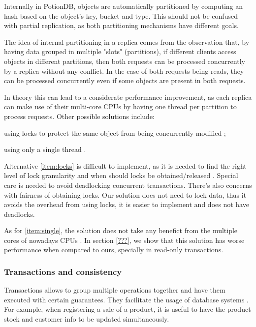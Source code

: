 \documentclass{vldb}
\begin{document}
Internally in PotionDB, objects are automatically partitioned by computing an hash based on the object's key, bucket and type.
This should not be confused with partial replication, as both partitioning mechanisms have different goals.

The idea of internal partitioning in a replica comes from the observation that, by having data grouped in multiple "slots" (partitions), if different clients access objects in different partitions, then both requests can be processed concurrently by a replica without any conflict.
In the case of both requests being reads, they can be processed concurrently even if some objects are present in both requests. %

In theory this can lead to a considerate performance improvement, as each replica can make use of their multi-core CPUs by having one thread per partition to process requests.
Other possible solutions include: 
\begin{enumerate*}[label=(\roman*)] 
	\item \label{item:locks} using locks to protect the same object from being concurrently modified \cite{???};
	\item \label{item:single} using only a single thread \cite{???}.
\end{enumerate*}

Alternative \ref{item:locks} is difficult to implement, as it is needed to find the right level of lock granularity and when should locks be obtained/released \cite{???}. 
Special care is needed to avoid deadlocking concurrent transactions. 
There's also concerns with fairness of obtaining locks.
Our solution does not need to lock data, thus it avoids the overhead from using locks, it is easier to implement and does not have deadlocks.

As for \ref{item:single}, the solution does not take any benefict from the multiple cores of nowadays CPUs \cite{???}. In section \ref{???}, we show that this solution has worse performance when compared to ours, specially in read-only transactions.

\subsubsection{Transactions and consistency}

Transactions allows to group multiple operations together and have them executed with certain guarantees.
They facilitate the usage of database systems \cite{???}.
For example, when registering a sale of a product, it is useful to have the product stock and customer info to be updated simultaneously. %
\end{document}
